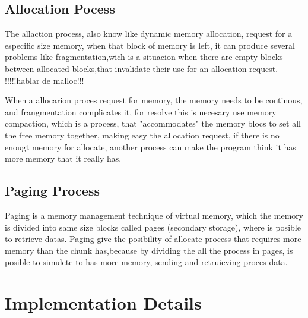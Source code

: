 \documentclass[twocolumn,showkeys,eqsecnum,prd,showpacs,notitlepage,9pt]{article}
\begin{document}
\subsection{Allocation Pocess}
The allaction process, also know like  dynamic memory allocation, request for a especific size memory, when that block of memory is left, it can produce several problems like fragmentation,wich is a situacion when there are empty blocks between allocated blocks,that invalidate their use for an allocation request.\\

!!!!!hablar de malloc!!!

When a allocarion proces request for memory, the memory needs to be continous, and frangmentation complicates it, for resolve this is necesary use memory compaction, which is a process, that "accommodates" the memory blocs to set all the free memory together, making easy the allocation request, if there is no enougt memory for allocate, another process can make the program think it has more memory that it really has.\\
\subsection{Paging Process}
Paging is a memory management technique of virtual memory, which the memory is divided into same size blocks called pages (secondary storage), where is posible to  retrieve datas. Paging give the posibility of allocate process that requires more memory than the chunk has,because by dividing the all the  process in pages, is posible to simulete to has more memory, sending and retruieving proces data.  
\section{Implementation Details}
\end{document}
